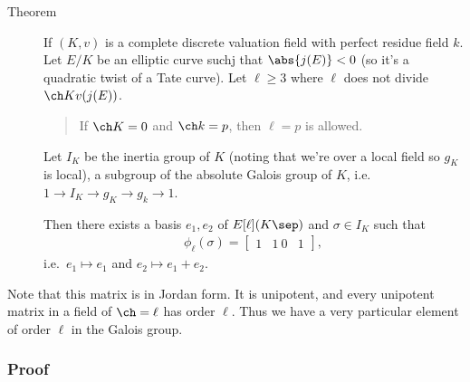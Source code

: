 \begin{description}
\item[Theorem]
If \((K, v)\) is a complete discrete valuation field with perfect
residue field \(k\). Let \(E/K\) be an elliptic curve suchj that
\(\abs{j(E)} < 0\) (so it's a quadratic twist of a Tate curve). Let
\(\ell \geq 3\) where \(\ell\) does not divide \(\ch K v(j(E))\).

\begin{quote}
If \(\ch K = 0\) and \(\ch k = p\), then \(\ell = p\) is allowed.
\end{quote}

Let \(I_K\) be the inertia group of \(K\) (noting that we're over a
local field so \(g_K\) is local), a subgroup of the absolute Galois
group of \(K\), i.e. \(1 \to I_K \to g_K \to g_k \to 1\).

Then there exists a basis \(e_1, e_2\) of \(E[\ell](K\sep)\) and
\(\sigma \in I_K\) such that \begin{align*}
\phi_\ell(\sigma) =
\begin{bmatrix}
1 & 1 \
0 & 1
\end{bmatrix}
,\end{align*} i.e.~\(e_1 \mapsto e_1\) and \(e_2 \mapsto e_1 + e_2\).
\end{description}

Note that this matrix is in Jordan form. It is unipotent, and every
unipotent matrix in a field of \(\ch = \ell\) has order \(\ell\). Thus
we have a very particular element of order \(\ell\) in the Galois group.

\hypertarget{proof}{%
\subsubsection{Proof}\label{proof}}

